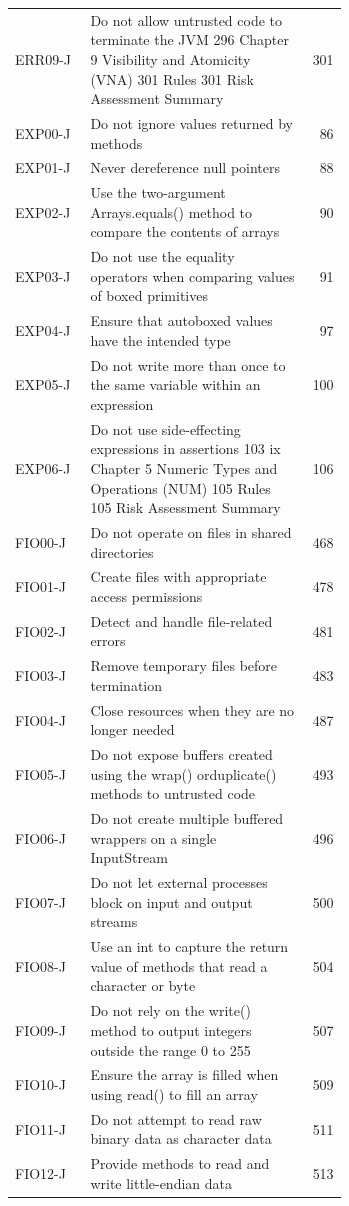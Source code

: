 \documentclass[11pt]{report}
\begin{document}
\begin{longtable}{@{}l>{\raggedright\arraybackslash}p{0.66\linewidth}r@{}}
ERR09-J & Do not allow untrusted code to terminate the JVM 296 Chapter 9 Visibility and Atomicity (VNA) 301 Rules 301 Risk Assessment Summary & 301\\
EXP00-J & Do not ignore values returned by methods & 86\\
EXP01-J & Never dereference null pointers & 88\\
EXP02-J & Use the two-argument Arrays.equals() method to compare the contents of arrays & 90\\
EXP03-J & Do not use the equality operators when comparing values of boxed primitives & 91\\
EXP04-J & Ensure that autoboxed values have the intended type & 97\\
EXP05-J & Do not write more than once to the same variable within an expression & 100\\
EXP06-J & Do not use side-effecting expressions in assertions 103 ix Chapter 5 Numeric Types and Operations (NUM) 105 Rules 105 Risk Assessment Summary & 106\\
FIO00-J & Do not operate on files in shared directories & 468\\
FIO01-J & Create files with appropriate access permissions & 478\\
FIO02-J & Detect and handle file-related errors & 481\\
FIO03-J & Remove temporary files before termination & 483\\
FIO04-J & Close resources when they are no longer needed & 487\\
FIO05-J & Do not expose buffers created using the wrap() orduplicate() methods to untrusted code & 493\\
FIO06-J & Do not create multiple buffered wrappers on a single InputStream & 496\\
FIO07-J & Do not let external processes block on input and output streams & 500\\
FIO08-J & Use an int to capture the return value of methods that read a character or byte & 504\\
FIO09-J & Do not rely on the write() method to output integers outside the range 0 to 255 & 507\\
FIO10-J & Ensure the array is filled when using read() to fill an array & 509\\
FIO11-J & Do not attempt to read raw binary data as character data & 511\\
FIO12-J & Provide methods to read and write little-endian data & 513\\

\end{longtable}
\end{document}
